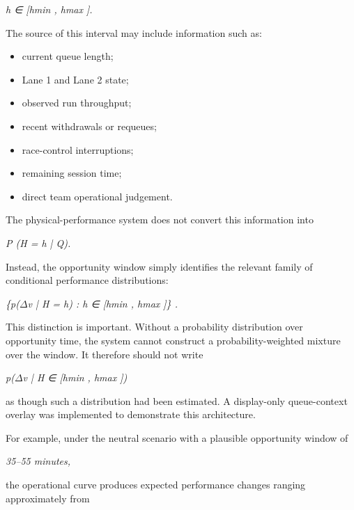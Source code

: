 \begin{center}\textit{h ∈ [hmin , hmax ].}\end{center}

The source of this interval may include information such as:

\begin{itemize}
\item current queue length;
\item Lane 1 and Lane 2 state;
\item observed run throughput;
\item recent withdrawals or requeues;
\item race-control interruptions;
\item remaining session time;
\item direct team operational judgement.
\end{itemize}

The physical-performance system does not convert this information into

\begin{center}\textit{P (H = h | Q).}\end{center}

Instead, the opportunity window simply identifies the relevant family of conditional performance distributions:

\begin{center}\textit{\{p(\ensuremath{\Delta}v | H = h) : h ∈ [hmin , hmax ]\} .}\end{center}

This distinction is important. Without a probability distribution over opportunity time, the system cannot construct a probability-weighted mixture over the window. It therefore should not write

\begin{center}\textit{p(\ensuremath{\Delta}v | H ∈ [hmin , hmax ])}\end{center}

as though such a distribution had been estimated. A display-only queue-context overlay was implemented to demonstrate this architecture.

For example, under the neutral scenario with a plausible opportunity window of

\begin{center}\textit{35--55 minutes,}\end{center}

the operational curve produces expected performance changes ranging approximately from

